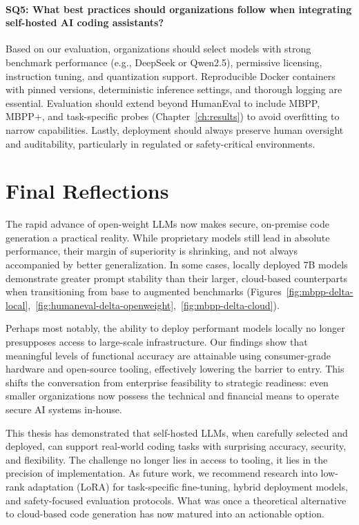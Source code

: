 \paragraph{SQ5: What best practices should organizations follow when integrating self-hosted AI coding assistants?}
Based on our evaluation, organizations should select models with strong benchmark performance (e.g., DeepSeek or Qwen2.5), permissive licensing, instruction tuning, and quantization support. Reproducible Docker containers with pinned versions, deterministic inference settings, and thorough logging are essential. Evaluation should extend beyond HumanEval to include MBPP, MBPP+, and task-specific probes (Chapter~\ref{ch:results}) to avoid overfitting to narrow capabilities. Lastly, deployment should always preserve human oversight and auditability, particularly in regulated or safety-critical environments.

\section{Final Reflections}

The rapid advance of open-weight LLMs now makes secure, on-premise code generation a practical reality. While proprietary models still lead in absolute performance, their margin of superiority is shrinking, and not always accompanied by better generalization. In some cases, locally deployed 7B models demonstrate greater prompt stability than their larger, cloud-based counterparts when transitioning from base to augmented benchmarks (Figures~\ref{fig:mbpp-delta-local},~\ref{fig:humaneval-delta-openweight},~\ref{fig:mbpp-delta-cloud}).

Perhaps most notably, the ability to deploy performant models locally no longer presupposes access to large-scale infrastructure. Our findings show that meaningful levels of functional accuracy are attainable using consumer-grade hardware and open-source tooling, effectively lowering the barrier to entry. This shifts the conversation from enterprise feasibility to strategic readiness: even smaller organizations now possess the technical and financial means to operate secure \gls{AI} systems in-house.

This thesis has demonstrated that self-hosted LLMs, when carefully selected and deployed, can support real-world coding tasks with surprising accuracy, security, and flexibility. The challenge no longer lies in access to tooling, it lies in the precision of implementation. As future work, we recommend research into low-rank adaptation (LoRA) for task-specific fine-tuning, hybrid deployment models, and safety-focused evaluation protocols. What was once a theoretical alternative to cloud-based code generation has now matured into an actionable option.
